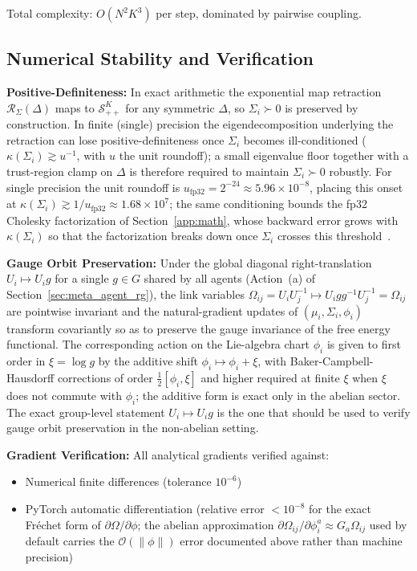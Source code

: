 \documentclass[11pt]{article}
\begin{document}
Total complexity: $O(N^2 K^3)$ per step, dominated by pairwise coupling.

\subsection*{Numerical Stability and Verification}

\textbf{Positive-Definiteness:} In exact arithmetic the exponential map retraction $\mathcal{R}_{\Sigma}(\Delta)$ maps to $\mathcal{S}_{++}^K$ for any symmetric $\Delta$, so $\Sigma_i \succ 0$ is preserved by construction. In finite (single) precision the eigendecomposition underlying the retraction can lose positive-definiteness once $\Sigma_i$ becomes ill-conditioned ($\kappa(\Sigma_i) \gtrsim u^{-1}$, with $u$ the unit roundoff); a small eigenvalue floor together with a trust-region clamp on $\Delta$ is therefore required to maintain $\Sigma_i \succ 0$ robustly. For single precision the unit roundoff is $u_{\mathrm{fp32}} = 2^{-24} \approx 5.96 \times 10^{-8}$, placing this onset at $\kappa(\Sigma_i) \gtrsim 1/u_{\mathrm{fp32}} \approx 1.68 \times 10^{7}$; the same conditioning bounds the fp32 Cholesky factorization of Section~\ref{app:math}, whose backward error grows with $\kappa(\Sigma_i)$ so that the factorization breaks down once $\Sigma_i$ crosses this threshold~\cite{Higham2008}.

\textbf{Gauge Orbit Preservation:} Under the global diagonal right-translation $U_i \mapsto U_i g$ for a single $g \in G$ shared by all agents (Action~(a) of Section~\ref{sec:meta_agent_rg}), the link variables $\Omega_{ij} = U_iU_j^{-1} \mapsto U_i g g^{-1} U_j^{-1} = \Omega_{ij}$ are pointwise invariant and the natural-gradient updates of $(\mu_i, \Sigma_i, \phi_i)$ transform covariantly so as to preserve the gauge invariance of the free energy functional. The corresponding action on the Lie-algebra chart $\phi_i$ is given to first order in $\xi = \log g$ by the additive shift $\phi_i \mapsto \phi_i + \xi$, with Baker-Campbell-Hausdorff corrections of order $\tfrac{1}{2}[\phi_i, \xi]$ and higher required at finite $\xi$ when $\xi$ does not commute with $\phi_i$; the additive form is exact only in the abelian sector. The exact group-level statement $U_i \mapsto U_i g$ is the one that should be used to verify gauge orbit preservation in the non-abelian setting.

\textbf{Gradient Verification:} All analytical gradients verified against:
\begin{itemize}
\item Numerical finite differences (tolerance $10^{-6}$)
\item PyTorch automatic differentiation (relative error $< 10^{-8}$ for the exact Fr\'echet form of $\partial\Omega/\partial\phi$; the abelian approximation $\partial\Omega_{ij}/\partial\phi_i^a \approx G_a\Omega_{ij}$ used by default carries the $\mathcal{O}(\|\phi\|)$ error documented above rather than machine precision)
\end{itemize}
\end{document}
